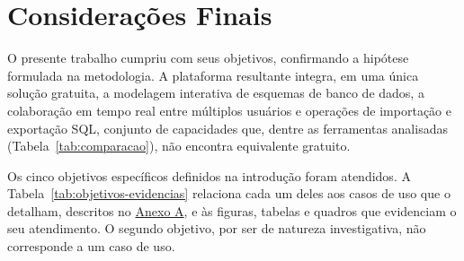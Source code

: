 \chapter{Considerações Finais}

O presente trabalho cumpriu com seus objetivos, confirmando a hipótese formulada na metodologia. A plataforma resultante integra, em uma única solução gratuita, a modelagem interativa de esquemas de banco de dados, a colaboração em tempo real entre múltiplos usuários e operações de importação e exportação SQL, conjunto de capacidades que, dentre as ferramentas analisadas (Tabela~\ref{tab:comparacao}), não encontra equivalente gratuito.

Os cinco objetivos específicos definidos na introdução foram atendidos. A Tabela~\ref{tab:objetivos-evidencias} relaciona cada um deles aos casos de uso que o detalham, descritos no \hyperref[anx:caso-de-uso]{Anexo A}, e às figuras, tabelas e quadros que evidenciam o seu atendimento. O segundo objetivo, por ser de natureza investigativa, não corresponde a um caso de uso.

